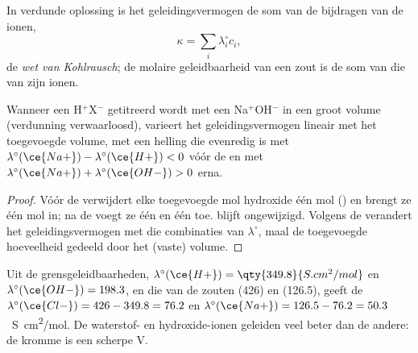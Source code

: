 \begin{proposition}\label{prop:b1:titration-methods:kohlrausch}
In verdunde oplossing is het geleidingsvermogen de som van de bijdragen
van de ionen,
\[
  \kappa = \sum_i \lambda_i^\circ c_i ,
\]
de \emph{wet van Kohlrausch}; de molaire
geleidbaarheid van een zout is de som van die van zijn ionen.
\end{proposition}


\begin{proposition}\label{prop:b1:titration-methods:conductimetric-slopes}
Wanneer een  H$^+$X$^-$ getitreerd wordt met een 
Na$^+$OH$^-$ in een groot volume (verdunning verwaarloosd), varieert het
geleidingsvermogen lineair met het toegevoegde volume, met een helling
die evenredig is met
$\lambda^\circ(\ce{Na+}) - \lambda^\circ(\ce{H+}) < 0$ vóór de
 en met $\lambda^\circ(\ce{Na+}) + \lambda^\circ(\ce{OH-}) > 0$
erna.
\end{proposition}

\begin{proof}
Vóór de  verwijdert elke toegevoegde mol hydroxide één mol
 () en brengt ze één mol  in; na de
 voegt ze één  en één  toe.  blijft
ongewijzigd. Volgens de  verandert het
geleidingsvermogen met die combinaties van $\lambda^\circ$, maal de
toegevoegde hoeveelheid gedeeld door het (vaste) volume.
\end{proof}

Uit de grensgeleidbaarheden, $\lambda^\circ(\ce{H+}) =
\qty{349.8}{S.cm^2/mol}$ en $\lambda^\circ(\ce{OH-}) = 198.3$, en die
van de zouten  (426) en  (126.5), geeft de  $\lambda^\circ(\ce{Cl-}) = 426 - 349.8 = 76.2$ en
$\lambda^\circ(\ce{Na+}) =
126.5 - 76.2 = 50.3$~\unit{S.cm^2/mol}. De waterstof- en hydroxide-ionen
geleiden veel beter dan de andere: de kromme is een scherpe V.

